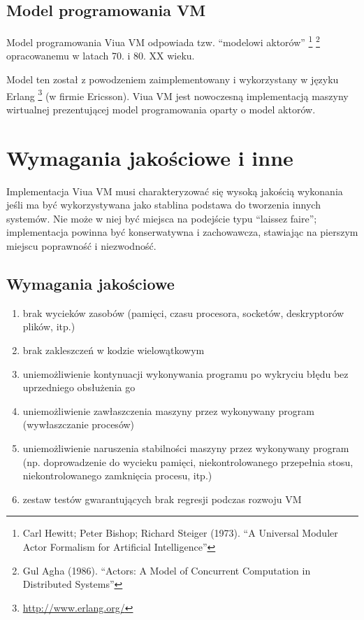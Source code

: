 \documentclass[11pt,oneside,a4paper,titlepage,onecolumn]{article}
\begin{document}
\subsection{Model programowania VM}

Model programowania Viua VM odpowiada tzw. ``modelowi aktorów''
\footnote{Carl Hewitt; Peter Bishop; Richard Steiger (1973). ``A Universal Moduler Actor Formalism for
Artificial Intelligence''}
\footnote{Gul Agha (1986). ``Actors: A Model of Concurrent Computation in Distributed Systems''}
opracowanemu w latach 70. i 80. XX wieku.

Model ten został z powodzeniem zaimplementowany i wykorzystany w języku Erlang
\footnote{\url{http://www.erlang.org/}} (w firmie Ericsson).
Viua VM jest nowoczesną implementacją maszyny wirtualnej prezentującej model programowania oparty o model
aktorów.

\section{Wymagania jakościowe i inne}

Implementacja Viua VM musi charakteryzować się wysoką jakością wykonania jeśli ma być wykorzystywana jako
stablina podstawa do tworzenia innych systemów. Nie może w niej być miejsca na podejście typu ``laissez
faire''; implementacja powinna być konserwatywna i zachowawcza, stawiając na pierszym miejscu poprawność i
niezwodność.

\subsection{Wymagania jakościowe}

\begin{enumerate}
    \item brak wycieków zasobów (pamięci, czasu procesora, socketów, deskryptorów plików, itp.)
    \item brak zakleszczeń w kodzie wielowątkowym
    \item uniemożliwienie kontynuacji wykonywania programu po wykryciu błędu bez uprzedniego obsłużenia go
    \item uniemożliwienie zawłaszczenia maszyny przez wykonywany program (wywłaszczanie procesów)
    \item uniemożliwienie naruszenia stabilności maszyny przez wykonywany program (np. doprowadzenie do
        wycieku pamięci, niekontrolowanego przepełnia stosu, niekontrolowanego zamknięcia procesu, itp.)
    \item zestaw testów gwarantujących brak regresji podczas rozwoju VM
\end{enumerate}
\end{document}
